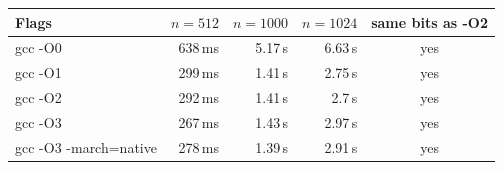\begin{tabular}{lrrrc}
\toprule
Flags & $n{=}512$ & $n{=}1000$ & $n{=}1024$ & same bits as -O2 \\
\midrule
gcc -O0 & 638\,ms & 5.17\,s & 6.63\,s & yes \\
gcc -O1 & 299\,ms & 1.41\,s & 2.75\,s & yes \\
gcc -O2 & 292\,ms & 1.41\,s & 2.7\,s & yes \\
gcc -O3 & 267\,ms & 1.43\,s & 2.97\,s & yes \\
gcc -O3 -march=native & 278\,ms & 1.39\,s & 2.91\,s & yes \\
\bottomrule
\end{tabular}
